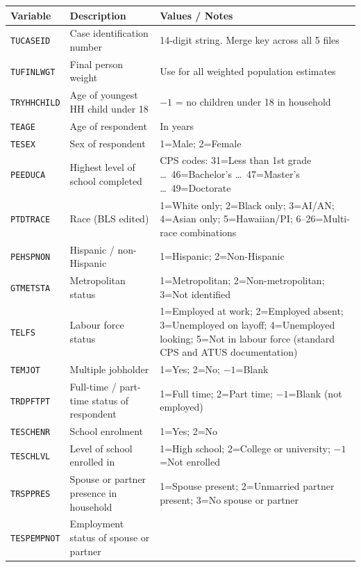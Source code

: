 \documentclass[11pt, a4paper]{article}
\begin{document}
\begin{longtable}{L{3cm} L{5.3cm} L{7cm}}
\toprule
\textbf{Variable} & \textbf{Description} & \textbf{Values / Notes} \\
\midrule \endhead \bottomrule \endfoot
\texttt{TUCASEID}    & Case identification number &
  14-digit string. Merge key across all 5 files \\
 \texttt{TUFINLWGT}   & Final person weight &
  Use for all weighted population estimates \\
\texttt{TRYHHCHILD}  & Age of youngest HH child under 18 &
  $-1$ = no children under 18 in household \\
 \texttt{TEAGE}       & Age of respondent & In years \\
\texttt{TESEX}       & Sex of respondent & 1=Male; 2=Female \\
 \texttt{PEEDUCA}     & Highest level of school completed &
  CPS codes: 31=Less than 1st grade \ldots\ 46=Bachelor's \ldots\
  47=Master's \ldots\ 49=Doctorate \\
\texttt{PTDTRACE}    & Race (BLS edited) &
  1=White only; 2=Black only; 3=AI/AN; 4=Asian only;
  5=Hawaiian/PI; 6--26=Multi-race combinations \\
 \texttt{PEHSPNON}    & Hispanic / non-Hispanic &
  1=Hispanic; 2=Non-Hispanic \\
\texttt{GTMETSTA}    & Metropolitan status &
  1=Metropolitan; 2=Non-metropolitan; 3=Not identified \\
 \texttt{TELFS}       & Labour force status &
  1=Employed at work; 2=Employed absent;
  3=Unemployed on layoff; 4=Unemployed looking; 5=Not in labour force (standard CPS and ATUS documentation) \\
\texttt{TEMJOT}      & Multiple jobholder &
  1=Yes; 2=No; $-1$=Blank \\
 \texttt{TRDPFTPT}    & Full-time / part-time status of respondent &
  1=Full time; 2=Part time; $-1$=Blank (not employed) \\
\texttt{TESCHENR}    & School enrolment & 1=Yes; 2=No \\
 \texttt{TESCHLVL}    & Level of school enrolled in &
  1=High school; 2=College or university; $-1$=Not enrolled \\
\texttt{TRSPPRES}    & Spouse or partner presence in household &
  1=Spouse present; 2=Unmarried partner present;
  3=No spouse or partner \\
 \texttt{TESPEMPNOT}  & Employment status of spouse or partner &

\end{longtable}
\end{document}
